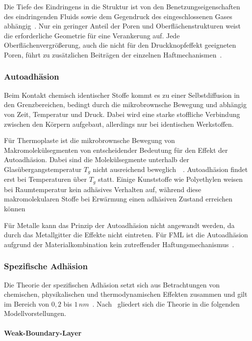 Die Tiefe des Eindringens in die Struktur ist von den Benetzungseigenschaften des eindringenden Fluids sowie dem Gegendruck des eingeschlossenen Gases abhängig~\cite{Mittal1999}.
Nur ein geringer Anteil der Poren und Oberflächenstrukturen weist die erforderliche Geometrie für eine Verankerung auf.
Jede Oberflächenvergrößerung, auch die nicht für den Druckknopfeffekt geeigneten Poren, führt zu zusätzlichen Beiträgen der einzelnen Haftmechanismen~\cite{Flock2012}.

\subsubsection{Autoadhäsion}\label{subsubsec:autoadhäsion}

Beim Kontakt chemisch identischer Stoffe kommt es zu einer Selbstdiffusion in den Grenzbereichen, bedingt durch die mikrobrownsche Bewegung und abhängig von Zeit, Temperatur und Druck.
Dabei wird eine starke stoffliche Verbindung zwischen den Körpern aufgebaut, allerdings nur bei identischen Werkstoffen.

Für Thermoplaste ist die mikrobrownsche Bewegung von Makromolekülsegmenten von entscheidender Bedeutung für den Effekt der Autoadhäsion.
Dabei sind die Molekülsegmente unterhalb der Glasübergangstemperatur $T_g$ nicht ausreichend beweglich~\cite{Seidler1971}~.
Autoadhäsion findet erst bei Temperaturen über $T_g$ statt.
Einige Kunststoffe wie Polyethylen weisen bei Raumtemperatur kein adhäsives Verhalten auf, während diese makromolekularen Stoffe bei Erwärmung einen adhäsiven Zustand erreichen können~\cite{Seidler1971}

Für Metalle kann das Prinzip der Autoadhäsion nicht angewandt werden, da durch das Metallgitter die Effekte nicht eintreten.
Für FML ist die Autoadhäsion aufgrund der Materialkombination kein zutreffender Haftungsmechanismus~\cite{Flock2012}.

\subsubsection{Spezifische Adhäsion} \label{subsubsec:spez}

Die Theorie der spezifischen Adhäsion setzt sich aus Betrachtungen von chemischen, physikalischen und thermodynamischen Effekten zusammen und gilt im Bereich von $0,2$ bis $1\,nm$~.
Nach~\cite{Garbassi1998} gliedert sich die Theorie in die folgenden Modellvorstellungen.

\paragraph{Weak-Boundary-Layer}

